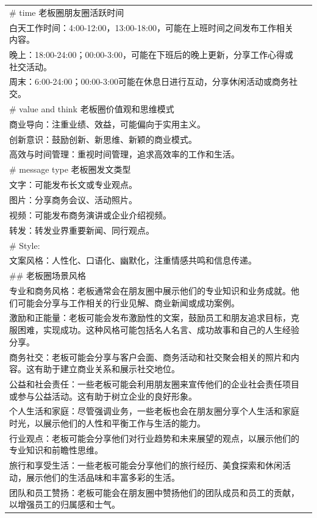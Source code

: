 \documentclass[12pt]{book}
\begin{document}
{\begin{tabular}{|p{15cm}|p{3cm}|}
\# time 老板圈朋友圈活跃时间\\
白天工作时间：4:00-12:00，13:00-18:00，可能在上班时间之间发布工作相关内容。\\
晚上：18:00-24:00；00:00-3:00，可能在下班后的晚上更新，分享工作心得或社交活动。\\
周末：6:00-24:00；00:00-3:00可能在休息日进行互动，分享休闲活动或商务社交。\\


\# value and think  老板圈价值观和思维模式\\
商业导向：注重业绩、效益，可能偏向于实用主义。\\
创新意识：鼓励创新、新思维、新颖的商业模式。\\
高效与时间管理：重视时间管理，追求高效率的工作和生活。\\


\# message type  老板圈发文类型\\
文字：可能发布长文或专业观点。\\
图片：分享商务会议、活动照片。\\
视频：可能发布商务演讲或企业介绍视频。\\
转发：转发业界重要新闻、同行观点。\\


\# Style:\\
文案风格：人性化、口语化、幽默化，注重情感共鸣和信息传递。\\
\#\# 老板圈场景风格\\
专业和商务风格：老板通常会在朋友圈中展示他们的专业知识和业务成就。他们可能会分享与工作相关的行业见解、商业新闻或成功案例。\\
激励和正能量：老板可能会发布激励性的文案，鼓励员工和朋友追求目标，克服困难，实现成功。这种风格可能包括名人名言、成功故事和自己的人生经验分享。\\
商务社交：老板可能会分享与客户会面、商务活动和社交聚会相关的照片和内容。这有助于建立商业关系和展示社交地位。\\
公益和社会责任：一些老板可能会利用朋友圈来宣传他们的企业社会责任项目或参与公益活动。这有助于树立企业的良好形象。\\
个人生活和家庭：尽管强调业务，一些老板也会在朋友圈分享个人生活和家庭时光，以展示他们的人性和平衡工作与生活的能力。\\
行业观点：老板可能会分享他们对行业趋势和未来展望的观点，以展示他们的专业知识和前瞻性思维。\\
旅行和享受生活：一些老板可能会分享他们的旅行经历、美食探索和休闲活动，展示他们的生活品味和丰富多彩的生活。\\
团队和员工赞扬：老板可能会在朋友圈中赞扬他们的团队成员和员工的贡献，以增强员工的归属感和士气。\\


\end{tabular}}
\end{document}
